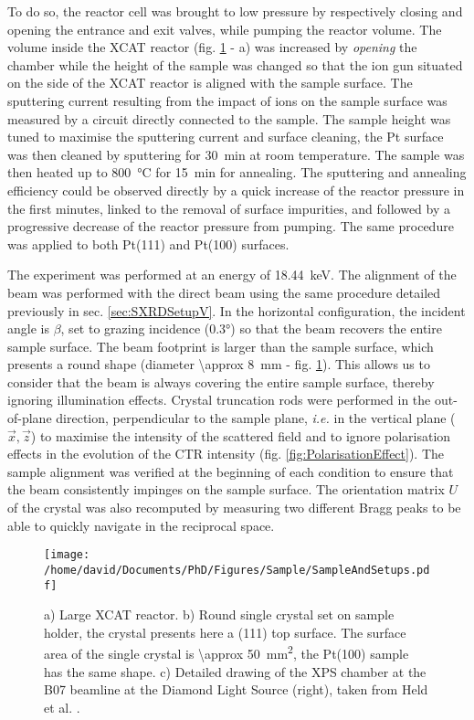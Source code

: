To do so, the reactor cell was brought to low pressure by respectively closing and opening the entrance and exit valves, while pumping the reactor volume.
The volume inside the XCAT reactor (fig. \ref{fig:SampleSXRD} - a) was increased by \textit{opening} the chamber while the height of the sample was changed so that the ion gun situated on the side of the XCAT reactor is aligned with the sample surface.
The sputtering current resulting from the impact of ions on the sample surface was measured by a circuit directly connected to the sample.
The sample height was tuned to maximise the sputtering current and surface cleaning, the Pt surface was then cleaned by sputtering for \qty{30}{\minute} at room temperature.
The sample was then heated up to \qty{800}{\degreeCelsius} for \qty{15}{\minute} for annealing.
The sputtering and annealing efficiency could be observed directly by a quick increase of the reactor pressure in the first minutes, linked to the removal of surface impurities, and followed by a progressive decrease of the reactor pressure from pumping.
The same procedure was applied to both Pt(111) and Pt(100) surfaces.

The experiment was performed at an energy of \qty{18.44}{\keV}.
The alignment of the beam was performed with the direct beam using the same procedure detailed previously in sec. \ref{sec:SXRDSetupV}.
In the horizontal configuration, the incident angle is $\beta$, set to grazing incidence (\ang{0.3}) so that the beam recovers the entire sample surface.
The beam footprint is larger than the sample surface, which presents a round shape (diameter \qty{\approx 8}{\mm} - fig. \ref{fig:SampleSXRD}).
This allows us to consider that the beam is always covering the entire sample surface, thereby ignoring illumination effects.
Crystal truncation rods were performed in the out-of-plane direction, perpendicular to the sample plane, \textit{i.e.} in the vertical plane ($\vec{x}, \vec{z}$) to maximise the intensity of the scattered field and to ignore polarisation effects in the evolution of the CTR intensity (fig. \ref{fig:PolarisationEffect}).
The sample alignment was verified at the beginning of each condition to ensure that the beam consistently impinges on the sample surface.
The orientation matrix $U$ of the crystal \parencite{Schleputz2011} was also recomputed by measuring two different Bragg peaks to be able to quickly navigate in the reciprocal space.

\begin{figure}[!htb]
    \centering
    \texttt{[image: /home/david/Documents/PhD/Figures/Sample/SampleAndSetups.pdf]}
    \caption{
        a) Large XCAT reactor.
        b) Round single crystal set on sample holder, the crystal presents here a (111) top surface.
        The surface area of the single crystal is \qty{\approx 50}{\mm^2}, the Pt(100) sample has the same shape.
        c) Detailed drawing of the XPS chamber at the B07 beamline at the Diamond Light Source (right), taken from Held et al. \parencite*{Held2020}.
    }
    \label{fig:SampleSXRD}
\end{figure}

